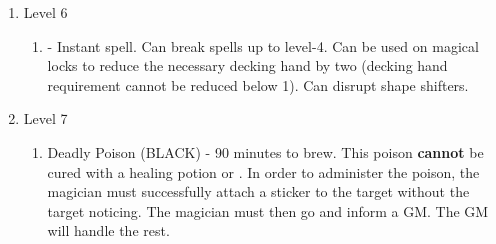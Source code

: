 \documentclass[blue]{NeptuneBall}
\begin{document}
\begin{enumerate}
\begin{enumerate}
   \end{enumerate}
   \item Level 6
    \begin{enumerate}
      \item \aGreaterDispel{} - Instant spell. Can break spells up to level-4. Can be used on magical locks to reduce the necessary decking hand by two (decking hand requirement cannot be reduced below 1). Can disrupt shape shifters.
    \end{enumerate}
   \item Level 7
    \begin{enumerate}
      \item Deadly Poison (BLACK) - 90 minutes to brew. This poison {\bf cannot} be cured with a healing potion or \aFirstAid{}. In order to administer the poison, the magician must successfully attach a sticker to the target without the target noticing. The magician must then go and inform a GM. The GM will handle the rest. 
    \end{enumerate}
\end{enumerate}
\end{document}
